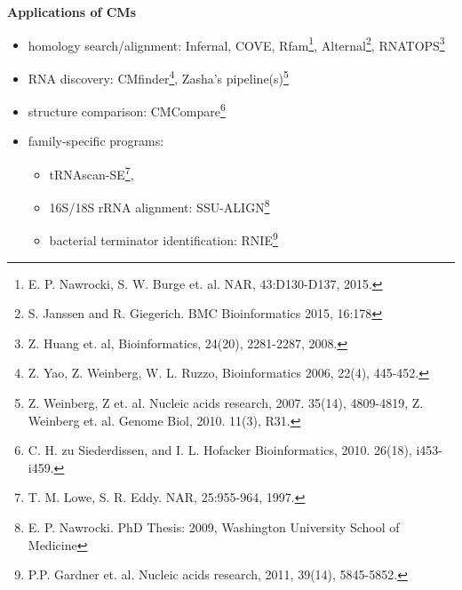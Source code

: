\documentclass[landscape]{slides}
\begin{document}
\begin{slide}
\begin{center}

\end{center}

\vfill
\end{slide}
\begin{slide}
\begin{center}
\textbf{Applications of CMs}
\end{center}

\small
\begin{itemize}
\item homology search/alignment: Infernal,
  COVE, Rfam\footnote{E. P. Nawrocki,
    S. W. Burge et. al.
    NAR, 43:D130-D137, 2015.}, 
    Alternal\footnote{S. Janssen and R. Giegerich. BMC Bioinformatics
      2015, 16:178}, RNATOPS\footnote{Z. Huang et. al, 
      Bioinformatics, 24(20), 2281-2287, 2008.}
    
\item RNA discovery: CMfinder\footnote{Z. Yao, Z. Weinberg, W. L. Ruzzo,
  Bioinformatics 2006, 22(4), 445-452.}, 
  Zasha's pipeline(s)\footnote{Z. Weinberg, Z et. al. Nucleic acids
    research, 2007. 35(14), 4809-4819,
    Z. Weinberg et. al. Genome Biol, 2010. 11(3), R31.}
\item structure comparison: CMCompare\footnote{C. H. zu Siederdissen, and
  I. L. Hofacker Bioinformatics, 2010. 26(18), i453-i459.}
\item family-specific programs: 
\begin{itemize}
\item tRNAscan-SE\footnote{T. M. Lowe, S. R. Eddy. NAR,
    25:955-964, 1997.}, 
\item 16S/18S rRNA alignment: SSU-ALIGN\footnote{ E. P. Nawrocki. PhD
  Thesis: 2009, Washington University School of Medicine}
\item bacterial terminator identification: RNIE\footnote{P.P. Gardner
  et. al. Nucleic acids research, 2011, 39(14), 5845-5852.}
\end{itemize}
\end{itemize}

\vfill 
\end{slide}
\end{document}
